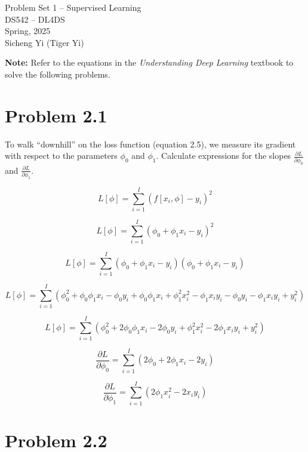 \documentclass[10pt]{article}
\begin{document}
\begin{center}
    \LARGE {Problem Set 1 – Supervised Learning} \\[1em]
    \Large{DS542 – DL4DS} \\[0.5em]
    \large Spring, 2025 \\[0.5em]
    \large Sicheng Yi (Tiger Yi)
\end{center}

\vspace{2em}

\noindent\textbf{Note:} Refer to the equations in the \textit{Understanding Deep Learning} textbook to solve the following problems.

\vspace{2em}

\section*{Problem 2.1}

To walk “downhill” on the loss function (equation 2.5), we measure its gradient with respect to the parameters $\phi_0$ and $\phi_1$. Calculate expressions for the slopes $\frac{\partial L}{\partial \phi_0}$ and $\frac{\partial L}{\partial \phi_1}$. 

$$ L[\phi] = \sum_{i=1}^{I} (f[x_i, \phi] - y_i)^2 $$

$$ L[\phi] = \sum_{i=1}^{I} (\phi_0 + \phi_1 x_i - y_i)^2 $$

$$ L[\phi] = \sum_{i=1}^{I} (\phi_0 + \phi_1 x_i - y_i) (\phi_0 + \phi_1 x_i - y_i)  $$

$$ L[\phi] = \sum_{i=1}^{I} (\phi_0^2 + \phi_0 \phi_1 x_i - \phi_0 y_i +  \phi_0 \phi_1 x_i  + \phi_1^2 x_i^2 -  \phi_1 x_i y_i  - \phi_0 y_i - \phi_1 x_i y_i + y_i^2  )  $$

$$ L[\phi] = \sum_{i=1}^{I} (\phi_0^2 + 2 \phi_0 \phi_1 x_i - 2 \phi_0 y_i  + \phi_1^2 x_i^2 -  2 \phi_1 x_i y_i   + y_i^2  )  $$

$$ \frac{\partial L}{\partial \phi_0} =  \sum_{i=1}^{I}  ( 2 \phi_0 + 2 \phi_1 x_i  - 2  y_i )  $$ 

$$\frac{\partial L}{\partial \phi_1} = \sum_{i=1}^{I}  ( 2 \phi_1 x_i^2 - 2 x_i y_i )   $$


\vspace{20em}


\section*{Problem 2.2}
\end{document}
